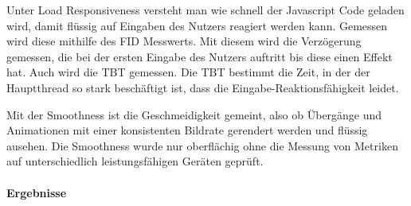 Unter Load Responsiveness versteht man wie schnell der Javascript Code geladen wird, damit flüssig auf Eingaben des Nutzers reagiert werden kann. Gemessen wird diese mithilfe des \ac{FID} Messwerts. Mit diesem wird die Verzögerung gemessen, die bei der ersten Eingabe des Nutzers auftritt bis diese einen Effekt hat. Auch wird die \ac{TBT} gemessen. Die \ac{TBT} bestimmt die Zeit, in der der Hauptthread so stark beschäftigt ist, dass die Eingabe-Reaktionsfähigkeit leidet.

Mit der Smoothness ist die Geschmeidigkeit gemeint, also ob Übergänge und Animationen mit einer konsistenten Bildrate gerendert werden und flüssig ausehen. Die Smoothness wurde nur oberflächig ohne die Messung von Metriken auf unterschiedlich leistungsfähigen Geräten geprüft.

\paragraph{Ergebnisse}




